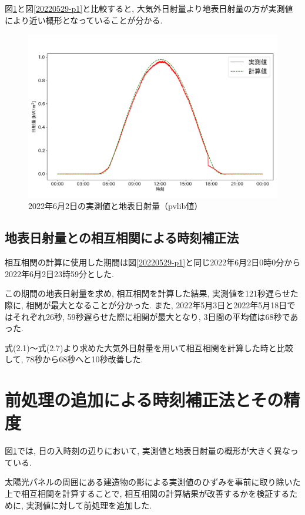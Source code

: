 図\ref{2-p1}と図\ref{20220529-p1}と比較すると, 大気外日射量より地表日射量の方が実測値により近い概形となっていることが分かる.

\begin{figure}[H]
  \hspace*{-1cm}
  \centering
  \includegraphics[width=160mm]{sotu/figure/2/pvlib-20220602-corr.png}
  \caption{2022年6月2日の実測値と地表日射量（pvlib値）}
  \label{2-p1}
\end{figure}

\subsection{地表日射量との相互相関による時刻補正法}
相互相関の計算に使用した期間は図\ref{20220529-p1}と同じ2022年6月2日0時0分から2022年6月2日23時59分とした.

この期間の地表日射量を求め, 相互相関を計算した結果, 実測値を121秒遅らせた際に, 相関が最大となることが分かった.  また, 2022年5月3日と2022年5月18日ではそれぞれ26秒, 59秒遅らせた際に相関が最大となり, 3日間の平均値は68秒であった.

式(2.1)～式(2.7)より求めた大気外日射量を用いて相互相関を計算した時と比較して, 78秒から68秒へと10秒改善した.

\section{前処理の追加による時刻補正法とその精度}

図\ref{2-p1}では, 日の入時刻の辺りにおいて, 実測値と地表日射量の概形が大きく異なっている.

太陽光パネルの周囲にある建造物の影による実測値のひずみを事前に取り除いた上で相互相関を計算することで, 相互相関の計算結果が改善するかを検証するために, 実測値に対して前処理を追加した.

